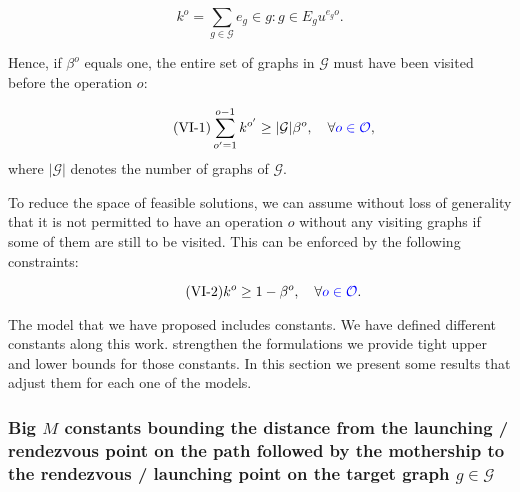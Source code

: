 $$k^o=\sum_{g\in\mathcal G}{e_g\in g:g\in E_g} u^{e_go}.$$

\noindent
Hence, if $\beta^o$ equals one, the entire set of graphs in $\mathcal G$ must have been visited before the operation $o$:

\begin{equation}\tag{VI-1}\label{eq:VI-1}
\sum_{o'=1}^{o-1} k^{o'} \geq |\mathcal G|\beta^o, \quad\forall {\color{blue}o\in\mathcal{O}},
\end{equation}
where $|\mathcal G|$ denotes the number of graphs of $\mathcal G$.

\noindent
To reduce the space of feasible solutions, we can assume without loss of generality that it is not permitted to have an operation $o$ without any visiting graphs if some of them are still to be visited. This can be enforced by the following constraints:

\begin{equation}\tag{VI-2}\label{eq:VI-2}
k^o \geq 1 - \beta^o, \quad\forall {\color{blue}o\in\mathcal{O}}.
\end{equation}

\noindent
The model that we have proposed includes  constants. We have defined different  constants along this work.  strengthen the formulations\RE{,} we provide tight upper and lower bounds for those constants. In this section\RE{,} we present some results that adjust them for each one of the models. 


\subsubsection*{Big $M$ constants bounding the distance from the launching / rendezvous point on the path followed by the mothership to the rendezvous / launching point on the target graph $g\in \mathcal{G}$}

